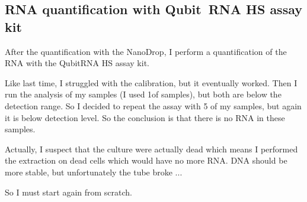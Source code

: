 \subsection{RNA quantification with Qubit\texttrademark ~RNA HS assay kit}
\label{task:20180110_cj2}

After the quantification with the NanoDrop, I perform a quantification of the RNA with the Qubit\texttrademark RNA HS assay kit. 

Like last time, I struggled with the calibration, but it eventually worked. Then I run the analysis of my samples (I used 1\uL of samples), but both are below the detection range. So I decided to repeat the assay with 5 \uL of my samples, but again it is below detection level. So the conclusion is that there is no RNA in these samples.

Actually, I suspect that the culture were actually dead which means I performed the extraction on dead cells which would have no more RNA. DNA should be more stable, but unfortunately the tube broke ...

So I must start again from scratch.